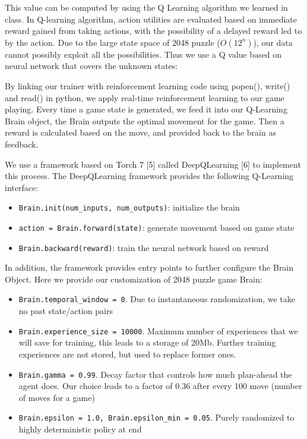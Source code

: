 \documentclass[9pt,twocolumn]{article}
\begin{document}
This value can be computed by using the Q Learning algorithm we learned in class. In Q-learning algorithm, action utilities are evaluated based on immediate reward gained from taking actions, with the possibility of a delayed reward led to by the action. Due to the large state space of 2048 puzzle ($O(12^n)$), our data cannot possibly exploit all the possibilities. Thus we use a Q value based on neural network that covers the unknown states:

By linking our trainer with reinforcement learning code using popen(), write() and read() in python, we apply real-time reinforcement learning to our game playing. Every time a game state is generated, we feed it into our Q-Learning Brain object, the Brain outputs the optimal movement for the game. Then a reward is calculated based on the move, and provided back to the brain as feedback.

We use a framework based on Torch 7 [5] called DeepQLearning [6] to implement this process. The DeepQLearning framework provides the following Q-Learning interface:

\begin{itemize}

\item \texttt{Brain.init(num\_inputs, num\_outputs)}: initialize the brain

\item \texttt{action = Brain.forward(state)}: generate movement based on game state

\item \texttt{Brain.backward(reward)}: train the neural network based on reward

\end{itemize}

In addition, the framework provides entry points to further configure the Brain Object. Here we provide our customization of 2048 puzzle game Brain:

\begin{itemize}

\item \texttt{Brain.temporal\_window = 0}. Due to instantaneous randomization, we take no past state/action pairs
\item \texttt{Brain.experience\_size = 10000}. Maximum number of experiences that we will save for training, this leads to a storage of 20Mb. Further training experiences are not stored, but used to replace former ones.
\item \texttt{Brain.gamma = 0.99}. Decay factor that controls how much plan-ahead the agent does. Our choice leads to a factor of 0.36 after every 100 move (number of moves for a game)
\item \texttt{Brain.epsilon = 1.0, Brain.epsilon\_min = 0.05}. Purely randomized to highly deterministic policy at end

\end{itemize}
\end{document}
